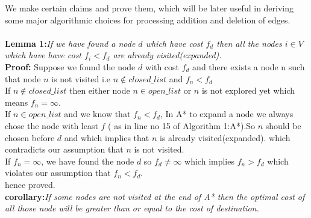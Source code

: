 \documentclass[a4paper]{article}
\begin{document}
We make certain claims and prove them, which will be later useful in deriving some major algorithmic choices for processing addition and deletion of edges.\\
\\
\hypertarget{Lemma 1}{\textbf{Lemma 1:}}\textit{If we have found a node $d$ which have cost $f_d$ then all the nodes $i \in V$ which have have cost $f_i < f_d$ are already visited(expanded).}\\
\textbf{Proof:} Suppose we found the node $d$ with cost $f_d$ and there exists a node n such that node $n$ is not visited i.e $n \notin closed\_list$ and $f_n < f_d$\\
If $n \notin closed\_list$ then either node $n \in open\_list$ or $n$ is not explored yet which means $f_n = \infty $.\\
If $n \in open\_list$  and we know that $f_n < f_d$, In A* to expand a node we always chose the node with least $f$ ( as in line no 15 of Algorithm 1:A*).So $n$ should be chosen before $d$ and which implies that $n$ is already visited(expanded). which contradicts our assumption that $n$ is not visited.\\
If $f_n = \infty $, we have found the node $d$ so $f_d \neq \infty$ which implies $f_n > f_d$ which violates our assumption that $f_n <  f_d$.\\
hence proved.\\
\textbf{corollary:}\textit{If some nodes are not visited at the end of A* then the optimal cost of all those node will be greater than or equal to the cost of destination. }
\end{document}
